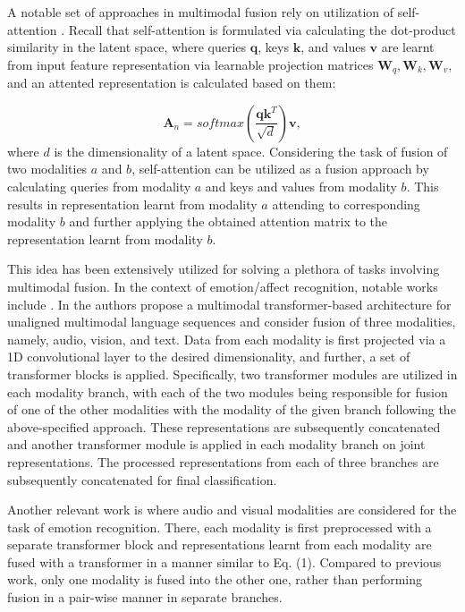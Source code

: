 \documentclass[a4paper,conference]{IEEEtran}
\begin{document}
A notable set of approaches in multimodal fusion rely on utilization of self-attention \cite{vaswani}. Recall that self-attention is formulated via calculating the dot-product similarity in the latent space, where queries $\mathbf{q}$,  keys $\mathbf{k}$, and values $\mathbf{v}$ are learnt from input feature representation via learnable projection matrices $\mathbf{W}_q, \mathbf{W}_k, \mathbf{W}_v$, and an attented representation is calculated based on them: 

\begin{equation}\label{eq:tau-att}
 \mathbf{A}_n = softmax\left(\frac{\mathbf{q}\mathbf{k}^T}{\sqrt{d}}\right)\mathbf{v},
  \end{equation} 
where $d$ is the dimensionality of a latent space. Considering the task of fusion of two modalities $a$ and $b$, self-attention can be utilized as a fusion approach by calculating queries from modality $a$ and keys and values from modality $b$. This results in representation learnt from modality $a$ attending to corresponding modality $b$ and further applying the obtained attention matrix to the representation learnt from modality $b$. 

This idea has been extensively utilized for solving a plethora of tasks involving multimodal fusion. In the context of emotion/affect recognition, notable works include \cite{mult, icasspav, interspeech}. In \cite{mult} the authors propose a multimodal transformer-based architecture for unaligned multimodal language sequences and consider fusion of three modalities, namely, audio, vision, and text. Data from each modality is first projected via a 1D convolutional layer to the desired dimensionality, and further, a set of transformer blocks is applied. Specifically, two transformer modules are utilized in each modality branch, with each of the two modules being responsible for fusion of one of the other modalities with the modality of the given branch following the above-specified approach. These representations are subsequently concatenated and another transformer module is applied in each modality branch on joint representations. The processed representations from each of three branches are subsequently concatenated for final classification.

Another relevant work is \cite{icasspav} where audio and visual modalities are considered for the task of emotion recognition. There, each modality is first preprocessed with a separate transformer block and representations learnt from each modality are fused with a transformer in a manner similar to Eq. (1). Compared to previous work, only one modality is fused into the other one, rather than performing fusion in a pair-wise manner in separate branches. 
\end{document}
